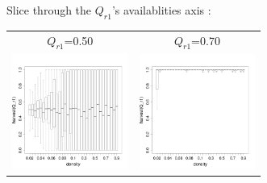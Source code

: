 \documentclass[8pt, handout=show,notes=show]{beamer}
\begin{document}
\begin{frame}{ Slice through the $Q_{r1}$'s availablities axis : }

	\renewcommand{\imgSize}{3.8cm}	
	\begin{table}[H]

		\centering
		\begin{tabular}{cc}
			$Q_{r1}$=0.50&$Q_{r1}$=0.70\\
			\includegraphics[width=\imgSize]{images/harvestr1_density_r1-50.png}&
			\includegraphics[width=\imgSize]{images/harvestr1_density_r1-70.png}\\

\end{tabular}
\end{table}
\end{frame}
\end{document}
